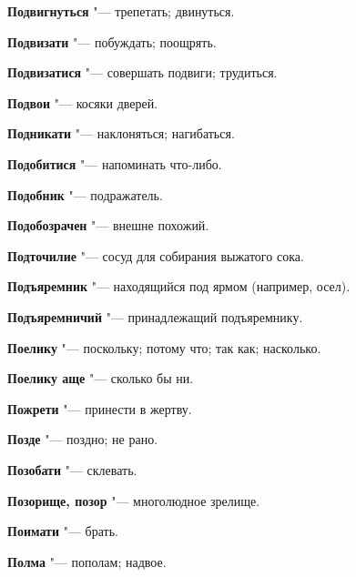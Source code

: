 \begin{mymulticols}{2}
\noindent\textbf{Подвигнуться} "--- трепетать; двинуться. 




\noindent\textbf{Подвизати} "--- побуждать; поощрять. 




\noindent\textbf{Подвизатися} "--- совершать подвиги; трудиться. 




\noindent\textbf{Подвои} "--- косяки дверей. 




\noindent\textbf{Подникати} "--- наклоняться; нагибаться. 




\noindent\textbf{Подобитися} "--- напоминать что-либо. 




\noindent\textbf{Подобник} "--- подражатель. 




\noindent\textbf{Подобозрачен} "--- внешне похожий. 




\noindent\textbf{Подточилие} "--- сосуд для собирания выжатого сока. 




\noindent\textbf{Подъяремник} "--- находящийся под ярмом (например, осел). 




\noindent\textbf{Подъяремничий} "--- принадлежащий подъяремнику. 




\noindent\textbf{Поелику} "--- поскольку; потому что; так как; насколько. 




\noindent\textbf{Поелику аще} "--- сколько бы ни. 




\noindent\textbf{Пожрети} "--- принести в жертву. 




\noindent\textbf{Позде} "--- поздно; не рано. 




\noindent\textbf{Позобати} "--- склевать. 




\noindent\textbf{Позорище, позор} "--- многолюдное зрелище. 




\noindent\textbf{Поимати} "--- брать. 




\noindent\textbf{Полма} "--- пополам; надвое. 





\end{mymulticols}
